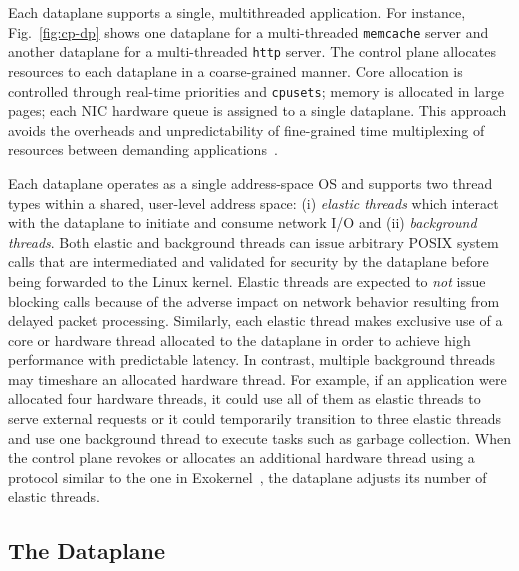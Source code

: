 Each \ix dataplane supports a single, multithreaded application. For
instance, Fig.~\ref{fig:cp-dp} shows one dataplane for a
multi-threaded \texttt{memcache} server and another dataplane for a
multi-threaded \texttt{http} server. The control plane allocates
resources to each dataplane in a coarse-grained manner. Core
allocation is controlled through real-time priorities and
\texttt{cpusets}; memory is allocated in large pages; each NIC
hardware queue is assigned to a single dataplane. This approach avoids
the overheads and unpredictability of fine-grained time multiplexing
of resources between demanding
applications~\cite{DBLP:conf/eurosys/LeverichK14}.

Each \ix dataplane operates as a single address-space OS and supports
two thread types within a shared, user-level address space: (i)
\emph{elastic threads} which interact with the \ix dataplane to
initiate and consume network I/O and (ii) \emph{background threads}.
Both elastic and background threads can issue arbitrary POSIX system
calls that are intermediated and validated for security by the
dataplane before being forwarded to the Linux kernel. Elastic threads
are expected to \emph{not} issue blocking calls because of the adverse
impact on network behavior resulting from delayed packet processing.
Similarly, each elastic
thread makes exclusive use of a core or hardware thread allocated to
the dataplane in order to achieve high performance with predictable
latency. In contrast, multiple background threads may timeshare an
allocated hardware thread. For example, if an application were
allocated four hardware threads, it could use all of them as elastic
threads to serve external requests or it could temporarily transition
to three elastic threads and use one background thread to execute
tasks such as garbage collection. When the control plane revokes or
allocates an additional hardware thread using a protocol similar to
the one in Exokernel~\cite{DBLP:conf/sosp/EnglerKO95}, the dataplane
adjusts its number of elastic threads.



\subsection{The \ix Dataplane}
\label{sec:impl:dpkernel}

